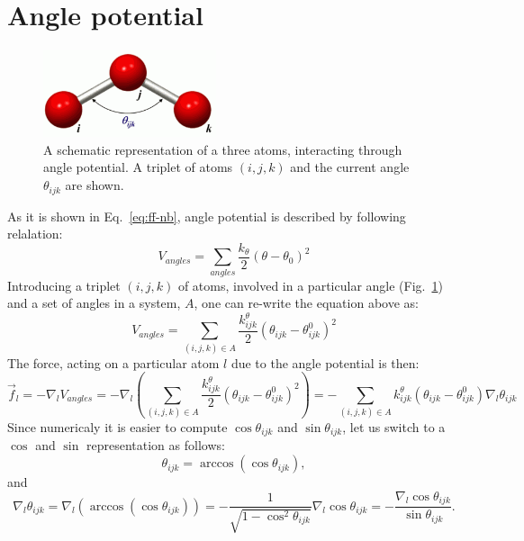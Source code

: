 \documentclass[11pt]{book}
\begin{document}
\section{Angle potential}
\begin{figure}[h]
\begin{center}
\includegraphics[width=2in]{Figures/PotScheme/pot-angle.png}
\end{center}
\caption{A schematic representation of a three atoms, interacting through angle potential. A triplet of atoms $(i,j,k)$ and the current angle $\theta_{ijk}$ are shown.}
\label{fig:pot-angle}
\end{figure}
As it is shown in Eq.~\ref{eq:ff-nb}, angle potential is described by following relalation:
\begin{equation}\label{eq:ff-angles1}
V_{angles} = \sum_{angles}\frac{k_{\theta}}{2}(\theta-\theta_0)^2
\end{equation}
Introducing a triplet $(i,j,k)$ of atoms, involved in a particular angle (Fig.~\ref{fig:pot-angle}) and a set of angles in a system, $A$, one can re-write the equation above as:
\begin{equation}\label{eq:ff-angles2}
V_{angles} = \sum_{(i,j,k) \in A}\frac{k_{ijk}^{\theta}}{2}(\theta_{ijk}-\theta^0_{ijk})^2
\end{equation}
The force, acting on a particular atom $l$ due to the angle potential is then:
\begin{equation}\label{eq:ff-angles3}
\vec{f}_{l}=-\nabla_{l}V_{angles} = -\nabla_{l}\left(\sum_{(i,j,k) \in A}\frac{k_{ijk}^{\theta}}{2}(\theta_{ijk}-\theta^0_{ijk})^2\right) = -\sum_{(i,j,k) \in A}k_{ijk}^{\theta}(\theta_{ijk}-\theta^0_{ijk})\nabla_{l}\theta_{ijk}
\end{equation}
Since numericaly it is easier to compute $\cos\theta_{ijk}$ and $\sin\theta_{ijk}$, let us switch to a $\cos$ and $\sin$ representation as follows:
\begin{equation}\label{eq:ff-angles4}
\theta_{ijk}=\arccos\left(\cos\theta_{ijk}\right),
\end{equation}
and
\begin{equation}\label{eq:ff-angles5}
\nabla_{l}\theta_{ijk} = \nabla_{l}\left(\arccos\left(\cos\theta_{ijk}\right)\right) = -\frac{1}{\sqrt{1-\cos^{2}\theta_{ijk}}}\nabla_{l}\cos\theta_{ijk} = -\frac{\nabla_{l}\cos\theta_{ijk}}{\sin\theta_{ijk}}.
\end{equation}
\end{document}

